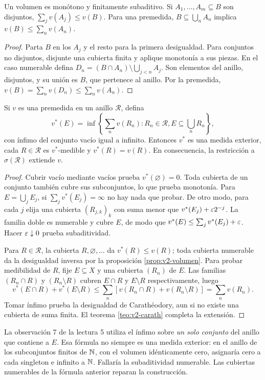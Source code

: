 \begin{proposicion}\label{prop:v2-volumen}
Un volumen es monótono y finitamente subaditivo. Si $A_1,\ldots,A_m\subseteq B$ son disjuntos, $\sum_jv(A_j)\le v(B)$. Para una premedida, $B\subseteq\bigcup_nA_n$ implica $v(B)\le\sum_nv(A_n)$.
\end{proposicion}
\begin{proof}
Parta $B$ en los $A_j$ y el resto para la primera desigualdad. Para conjuntos no disjuntos, disjunte una cubierta finita y aplique monotonía a sus piezas. En el caso numerable defina $D_n=(B\cap A_n)\setminus\bigcup_{j<n}A_j$. Son elementos del anillo, disjuntos, y su unión es $B$, que pertenece al anillo. Por la premedida,
$v(B)=\sum_nv(D_n)\le\sum_nv(A_n)$.
\end{proof}
\begin{teorema}\label{teo:v2-extension}
Si $v$ es una premedida en un anillo $\mathcal R$, defina
\[v^*(E)=\inf\left\{\sum_nv(R_n):R_n\in\mathcal R, E\subseteq\bigcup_nR_n\right\},\]
con ínfimo del conjunto vacío igual a infinito. Entonces $v^*$ es una medida exterior, cada $R\in\mathcal R$ es $v^*$-medible y $v^*(R)=v(R)$. En consecuencia, la restricción a $\sigma(\mathcal R)$ extiende $v$.
\end{teorema}
\begin{proof}
Cubrir vacío mediante vacíos prueba $v^*(\varnothing)=0$. Toda cubierta de un conjunto también cubre sus subconjuntos, lo que prueba monotonía. Para $E=\bigcup_jE_j$, si $\sum_jv^*(E_j)=\infty$ no hay nada que probar. De otro modo, para cada $j$ elija una cubierta $(R_{j,k})_k$ con suma menor que $v^*(E_j)+\varepsilon2^{-j}$. La familia doble es numerable y cubre $E$, de modo que $v^*(E)\le\sum_jv^*(E_j)+\varepsilon$. Hacer $\varepsilon\downarrow0$ prueba subaditividad.

Para $R\in\mathcal R$, la cubierta $R,\varnothing,\ldots$ da $v^*(R)\le v(R)$; toda cubierta numerable da la desigualdad inversa por la proposición \ref{prop:v2-volumen}. Para probar medibilidad de $R$, fije $E\subseteq X$ y una cubierta $(R_n)$ de $E$. Las familias $(R_n\cap R)$ y $(R_n\setminus R)$ cubren $E\cap R$ y $E\setminus R$ respectivamente, luego
\[v^*(E\cap R)+v^*(E\setminus R)\le\sum_n[v(R_n\cap R)+v(R_n\setminus R)]=\sum_nv(R_n).\]
Tomar ínfimo prueba la desigualdad de Carathéodory, aun si no existe una cubierta de suma finita. El teorema \ref{teo:v2-carath} completa la extensión.
\end{proof}
\begin{observacion}
La observación 7 de la lectura 5 utiliza el ínfimo sobre \emph{un solo conjunto} del anillo que contiene a $E$. Esa fórmula no siempre es una medida exterior: en el anillo de los subconjuntos finitos de $\mathbb N$, con el volumen idénticamente cero, asignaría cero a cada singleton e infinito a $\mathbb N$. Fallaría la subaditividad numerable. Las cubiertas numerables de la fórmula anterior reparan la construcción.
\end{observacion}
